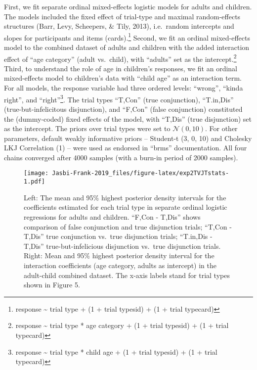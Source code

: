 \documentclass[,man,floatsintext]{apa6}
\let\rmarkdownfootnote\footnote%
\def\footnote{\protect\rmarkdownfootnote}
\begin{document}
First, we fit separate ordinal mixed-effects logistic models for adults and children. The models included the fixed effect of trial-type and maximal random-effects structures (Barr, Levy, Scheepers, \& Tily, 2013), i.e.~random intercepts and slopes for participants and items (cards).\footnote{response \textasciitilde{} trial type + (1 + trial type\textbar{}sid) + (1 + trial type\textbar{}card)} Second, we fit an ordinal mixed-effects model to the combined dataset of adults and children with the added interaction effect of \enquote{age category} (adult vs.~child), with \enquote{adults} set as the intercept.\footnote{response \textasciitilde{} trial type * age category + (1 + trial type\textbar{}sid) + (1 + trial type\textbar{}card)} Third, to understand the role of age in children's responses, we fit an ordinal mixed-effects model to children's data with \enquote{child age} as an interaction term. For all models, the response variable had three ordered levels: \enquote{wrong}, \enquote{kinda right}, and \enquote{right}\footnote{response \textasciitilde{} trial type * child age + (1 + trial type\textbar{}sid) + (1 + trial type\textbar{}card)}. The trial types \enquote{T,Con} (true conjunction), \enquote{T.in,Dis} (true-but-infelicitous disjunction), and \enquote{F,Con} (false conjunction) constituted the (dummy-coded) fixed effects of the model, with \enquote{T,Dis} (true disjunction) set as the intercept. The priors over trial types were set to \(\mathcal{N}(0,10)\). For other parameters, default weakly informative priors -- Student-t (3, 0, 10) and Cholesky LKJ Correlation (1) -- were used as endorsed in \enquote{brms} documentation. All four chains converged after 4000 samples (with a burn-in period of 2000 samples).

\begin{figure}
\centering
\texttt{[image: Jasbi-Frank-2019\_files/figure-latex/exp2TVJTstats-1.pdf]}
\caption{\label{fig:exp2TVJTstats}Left: The mean and 95\% highest posterior density intervals for the coefficients estimated for each trial type in separate ordinal logistic regressions for adults and children. \enquote{F,Con - T,Dis} shows comparison of false conjunction and true disjunction trials; \enquote{T,Con - T,Dis} true conjunction vs.~true disjunction trials; \enquote{T.in,Dis - T,Dis} true-but-infelicious disjunction vs.~true disjunction trials. Right: Mean and 95\% highest posterior density interval for the interaction coefficients (age category, adults as intercept) in the adult-child combined dataset. The x-axis labels stand for trial types shown in Figure 5.}
\end{figure}
\end{document}
